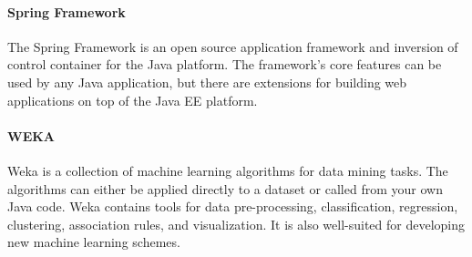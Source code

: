 \paragraph{Spring Framework}
The Spring Framework is an open source application framework and inversion
of control container for the Java platform. The framework's core features
can be used by any Java application, but there are extensions for building
web applications on top of the Java EE platform.

\paragraph{WEKA}
Weka is a collection of machine learning algorithms for data mining tasks.
The algorithms can either be applied directly to a dataset or called from your
own Java code. Weka contains tools for data pre-processing, classification,
regression, clustering, association rules, and visualization. It is also
well-suited for developing new machine learning schemes.
